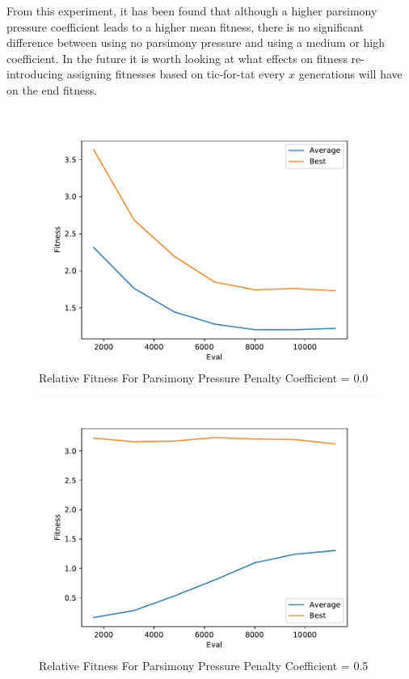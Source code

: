 \documentclass[times]{article}
\begin{document}
	From this experiment, it has been found that although a higher parsimony pressure coefficient leads to a higher mean fitness, there is no significant difference between using no parsimony pressure and using a medium or high coefficient. In the future it is worth looking at what effects on fitness re-introducing assigning fitnesses based on tic-for-tat every $x$ generations will have on the end fitness.

	\begin{figure}
		\caption{Relative Fitness For Parsimony Pressure Penalty Coefficient = 0.0}
		\label{fig:relative_plot_0}
		\includegraphics[width=\textwidth]{../graph/graphs/0.pdf}
	\end{figure}

	\begin{figure}
		\caption{Relative Fitness For Parsimony Pressure Penalty Coefficient = 0.5}
		\label{fig:relative_plot_1}
		\includegraphics[width=\textwidth]{../graph/graphs/1.pdf}
	\end{figure}
\end{document}
